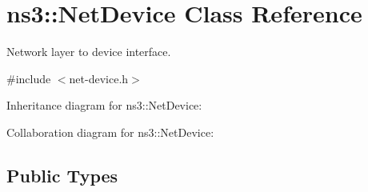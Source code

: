\hypertarget{classns3_1_1NetDevice}{}\section{ns3\+:\+:Net\+Device Class Reference}
\label{classns3_1_1NetDevice}


Network layer to device interface.  




{\ttfamily \#include $<$net-\/device.\+h$>$}



Inheritance diagram for ns3\+:\+:Net\+Device\+:


Collaboration diagram for ns3\+:\+:Net\+Device\+:
\subsection*{Public Types}
